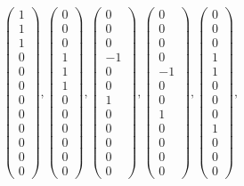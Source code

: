 \[
\left( \begin{array}{r} 1\\1\\1\\0\\0\\0\\0\\0\\0\\0\\0\\0 \end{array} \right), 
\left( \begin{array}{r} 0\\0\\0\\1\\1\\1\\0\\0\\0\\0\\0\\0 \end{array} \right), 
\left( \begin{array}{r} 0\\0\\0\\-1\\0\\0\\1\\0\\0\\0\\0\\0 \end{array} \right), 
\left( \begin{array}{r} 0\\0\\0\\0\\-1\\0\\0\\1\\0\\0\\0\\0 \end{array} \right), 
\left( \begin{array}{r} 0\\0\\0\\1\\1\\0\\0\\0\\1\\0\\0\\0 \end{array} \right), 
\]
